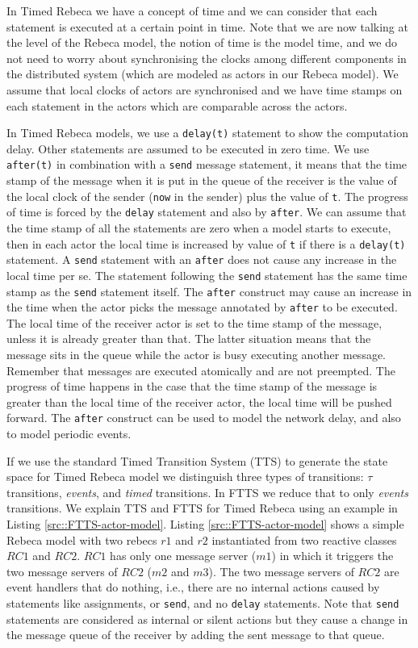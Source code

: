 In Timed Rebeca we have a concept of time and we can consider that each statement is executed at a certain point in time. Note that we are now talking at the level of the Rebeca model, the notion of time is the model time, and we do not need to worry about synchronising the clocks among different components in the distributed system (which are modeled as actors in our Rebeca model). We assume that local clocks of actors are synchronised and we  have time stamps on each statement  in the actors which are comparable across the actors.

In Timed Rebeca models, we use a \texttt{delay(t)} statement to show the computation delay. Other statements are assumed to be executed in zero time. We use  \texttt{after(t)} in combination with a \texttt{send} message statement, it means that the time stamp of the message when it is put in the queue of the receiver is the value of the local clock of the sender (\texttt{now} in the sender) plus the value of \texttt{t}.
The progress of time is forced by the \texttt{delay} statement and also by \texttt{after}. 
We can assume that the time stamp of all the statements are zero when a model starts to execute, then in each actor the local time is increased by value of \texttt{t} if there is a \texttt{delay(t)} statement.
A \texttt{send} statement with an  \texttt{after} does not cause any increase in the local time per se. The statement following the \texttt{send} statement has the same time stamp as the \texttt{send} statement itself.
The \texttt{after} construct may cause an increase in the time when the actor picks the message annotated by \texttt{after} to be executed. The local time of the receiver actor is set to the time stamp of the message, unless it is already greater than that.
The latter situation means that the message  sits in the queue while the actor is busy executing another message.
Remember that messages are executed atomically and are not preempted.
%
The progress of time happens in the case that the time stamp of the message is greater than the local time of the receiver actor, the local time will be pushed forward.
%
The \texttt{after} construct can be used to model the network delay, and also to model periodic events.


If we use the standard Timed Transition System (TTS) to generate the state space for Timed Rebeca model we distinguish three types of transitions: $\tau$ transitions, \textit{events}, and \textit{timed} transitions.
In FTTS we reduce that to only \textit{events} transitions.
%
We explain TTS and FTTS for Timed Rebeca using an example in Listing \ref{src::FTTS-actor-model}.
Listing \ref{src::FTTS-actor-model} shows a simple Rebeca model with two rebecs $r1$ and $r2$ instantiated from two reactive classes $RC1$ and $RC2$.
$RC1$ has only one message server ($m1$) in which it triggers the two message servers of $RC2$ ($m2$ and $m3$).
The two message servers of $RC2$ are event handlers that do nothing, i.e., there are no internal actions caused by statements like assignments, or \texttt{send}, and no  \texttt{delay} statements. Note that \texttt{send} statements are considered as internal or silent actions but they cause a change in the message queue of the receiver by adding the sent message to that queue.
 
